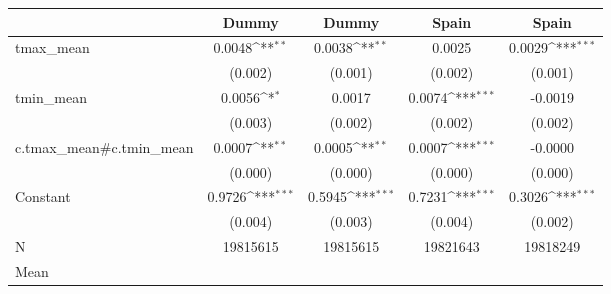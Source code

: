 {
\def\sym#1{\ifmmode^{#1}\else\(^{#1}\)\fi}
\begin{tabular}{l*{4}{c}}
\toprule
            &\multicolumn{1}{c}{Dummy}&\multicolumn{1}{c}{Dummy}&\multicolumn{1}{c}{Spain}&\multicolumn{1}{c}{Spain}\\
\midrule
tmax\_mean   &      0.0048\sym{**} &      0.0038\sym{**} &      0.0025         &      0.0029\sym{***}\\
            &     (0.002)         &     (0.001)         &     (0.002)         &     (0.001)         \\
tmin\_mean   &      0.0056\sym{*}  &      0.0017         &      0.0074\sym{***}&     -0.0019         \\
            &     (0.003)         &     (0.002)         &     (0.002)         &     (0.002)         \\
c.tmax\_mean#c.tmin\_mean&      0.0007\sym{**} &      0.0005\sym{**} &      0.0007\sym{***}&     -0.0000         \\
            &     (0.000)         &     (0.000)         &     (0.000)         &     (0.000)         \\
Constant    &      0.9726\sym{***}&      0.5945\sym{***}&      0.7231\sym{***}&      0.3026\sym{***}\\
            &     (0.004)         &     (0.003)         &     (0.004)         &     (0.002)         \\
\midrule
N           &    19815615         &    19815615         &    19821643         &    19818249         \\
Mean        &                     &                     &                     &                     \\
\bottomrule
\end{tabular}
}
